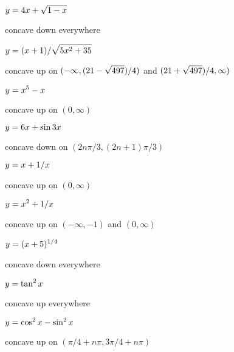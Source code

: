 \begin{exercises}
\begin{exercise} $\displaystyle y = 4x+\sqrt{1-x}$
\begin{answer} concave down everywhere
\end{answer}\end{exercise}

\begin{exercise} $\displaystyle y = (x+1)/\sqrt{5x^2 + 35}$
\begin{answer} concave up on $\displaystyle (-\infty,(21-\sqrt{497})/4)$ and 
$\displaystyle (21+\sqrt{497})/4,\infty)$
\end{answer}\end{exercise}

\begin{exercise} $\displaystyle y= x^5 - x$
\begin{answer} concave up on $(0,\infty)$
\end{answer}\end{exercise}

\begin{exercise} $\displaystyle y = 6x + \sin 3x$
\begin{answer} concave down on $(2n\pi/3,(2n+1)\pi/3)$
\end{answer}\end{exercise}

\begin{exercise} $\displaystyle y = x+ 1/x$
\begin{answer} concave up on $(0,\infty)$
\end{answer}\end{exercise}

\begin{exercise} $\displaystyle y = x^2+ 1/x$
\begin{answer} concave up on $(-\infty,-1)$ and $(0,\infty)$
\end{answer}\end{exercise}

\begin{exercise} $\displaystyle y = (x+5)^{1/4}$
\begin{answer} concave down everywhere
\end{answer}\end{exercise}

\begin{exercise} $\displaystyle y = \tan^2 x$
\begin{answer} concave up everywhere
\end{answer}\end{exercise}

\begin{exercise} $\displaystyle y =\cos^2 x - \sin^2 x$
\begin{answer} concave up on $(\pi/4+n\pi,3\pi/4+n\pi)$
\end{answer}\end{exercise}


\end{exercises}
